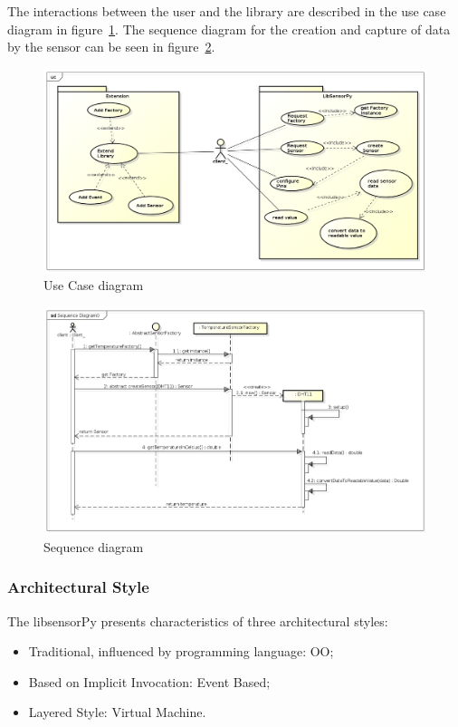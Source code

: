 \documentclass{acm_proc_article-sp}
\begin{document}
The interactions between the user and the library are described in the use case diagram  in figure~\ref{fig:useCase}. The sequence diagram for the creation and capture of data by the sensor can be seen in figure~\ref{fig:sequence}.
\begin{figure}[ht]
    \includegraphics[width=1.0\textwidth,natwidth=610,natheight=642]{pictures/UseCaseDiagram.png}
    \caption{Use Case diagram}
    \label{fig:useCase}
\end{figure}

\begin{figure}[t]
    \includegraphics[width=1.0\textwidth,natwidth=610,natheight=642]{pictures/SequenceDiagram3.png}
    \caption{Sequence diagram}
    \label{fig:sequence}
\end{figure}

\subsubsection{Architectural Style}
The libsensorPy presents characteristics of three architectural styles: 
\begin{itemize}
\item Traditional, influenced by programming language: OO;
\item Based on Implicit Invocation: Event Based; 
\item Layered Style: Virtual Machine.
\end{itemize}
\end{document}

